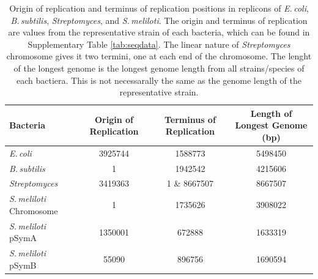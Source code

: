 \documentclass[11pt]{article}
\newcommand{\smel}{\textit{S.\,meliloti}\xspace}
\newcommand{\strep}{\textit{Streptomyces}\xspace}
\newcommand{\ecol}{\textit{E.\,coli}\xspace}
\newcommand{\bass}{\textit{B.\,subtilis}\xspace}
\begin{document}
	\begin{table}[H]
		\begin{center}
			\begin{tabular}{lccc}
				\toprule
				Bacteria & Origin of Replication & Terminus of Replication & Length of Longest Genome (bp)\\
				\midrule
				\ecol & 3925744 & 1588773 & 5498450 \\
				\bass & 1 & 1942542 & 4215606\\
				\strep & 3419363 & 1 \& 8667507 & 8667507\\
				\smel Chromosome & 1 & 1735626 & 3908022\\
				\smel pSymA & 1350001 & 672888 & 1633319\\
				\smel pSymB & 55090 & 896756 & 1690594\\
				\bottomrule
			\end{tabular}
			\caption{\label{tab:oriloc} Origin of replication and terminus of replication positions in replicons of \ecol, \bass, \strep, and \smel. The origin and terminus of replication are values from the representative strain of each bacteria, which can be found in Supplementary Table \ref{tab:seqdata}. The linear nature of \strep chromosome gives it two termini, one at each end of the chromosome. The lenght of the longest genome is the longest genome length from all strains/species of each bactiera. This is not necessarally the same as the genome length of the representative strain.}
		\end{center}
	\end{table}
	
\end{document}
